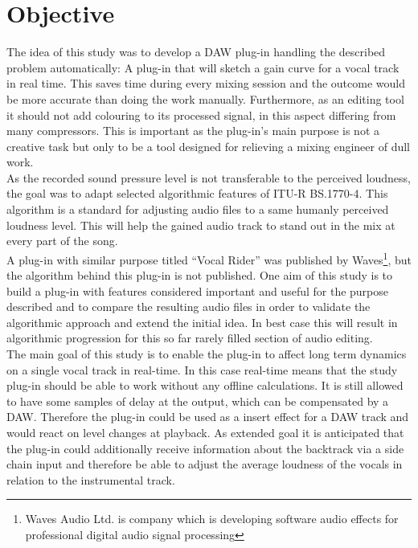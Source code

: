 \section{Objective}

The idea of this study was to develop a DAW plug-in handling the described problem automatically: A plug-in that will sketch a gain curve for a vocal track in real time. This saves time during every mixing session and the outcome would be more accurate than doing the work manually. Furthermore, as an editing tool it should not add colouring to its processed signal, in this aspect differing from many compressors. This is important as the plug-in's main purpose is not a creative task but only to be a tool designed for relieving a mixing engineer of dull work.\\
As the recorded sound pressure level is not transferable to the perceived loudness, the goal was to adapt selected algorithmic features of ITU-R BS.1770-4\cite{ITUalgo}. This algorithm is a standard for adjusting audio files to a same humanly perceived loudness level. This will help the gained audio track to stand out in the mix at every part of the song.\\
A plug-in with similar purpose titled “Vocal Rider”\cite{VR} was published by Waves\footnote{Waves Audio Ltd. is company which is developing software audio effects for professional digital audio signal processing}, but the algorithm behind this plug-in is not published. One aim of this study is to build a plug-in with features considered important and useful for the purpose described and to compare the resulting audio files in order to validate the algorithmic approach and extend the initial idea. In best case this will result in algorithmic progression for this so far rarely filled section of audio editing.\\
The main goal of this study is to enable the plug-in to affect long term dynamics on a single vocal track in real-time. In this case real-time means that the study plug-in should be able to work without any offline calculations. It is still allowed to have some samples of delay at the output, which can be compensated by a DAW. Therefore the plug-in could be used as a insert effect for a DAW track and would react on level changes at playback. As extended goal it is anticipated that the plug-in could additionally receive information about the backtrack via a side chain input and therefore be able to adjust the average loudness of the vocals in relation to the instrumental track.\\

